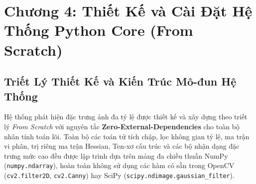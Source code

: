 \documentclass[conference]{IEEEtran}
\begin{document}


\section{Chương 4: Thiết Kế và Cài Đặt Hệ Thống Python Core (From Scratch)}

\subsection{Triết Lý Thiết Kế và Kiến Trúc Mô-đun Hệ Thống}
Hệ thống phát hiện đặc trưng ảnh đa tỷ lệ được thiết kế và xây dựng theo triết lý \textit{From Scratch} với nguyên tắc \textbf{Zero-External-Dependencies} cho toàn bộ nhân tính toán lõi. Toàn bộ các toán tử tích chập, lọc không gian tỷ lệ, ma trận vi phân, trị riêng ma trận Hessian, Ten-xơ cấu trúc và các bộ nhận dạng đặc trưng mức cao đều được lập trình dựa trên mảng đa chiều thuần NumPy (\texttt{numpy.ndarray}), hoàn toàn không sử dụng các hàm có sẵn trong OpenCV (\texttt{cv2.filter2D}, \texttt{cv2.Canny}) hay SciPy (\texttt{scipy.ndimage.gaussian\_filter}).
\end{document}

